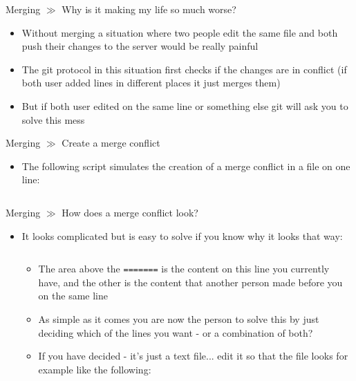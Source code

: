 \documentclass[10pt]{beamer}
\begin{document}
\begin{frame}{Merging $\gg$ Why is it making my life so much worse?}
\begin{itemize}
	\item Without merging a situation where two people edit the same file and both push their changes to the server would be really painful
	\item The git protocol in this situation first checks if the changes are in conflict (if both user added lines in different places it just merges them)
	\item But if both user edited on the same line or something else git will ask you to solve this mess
\end{itemize}
\end{frame}

\begin{frame}{Merging $\gg$ Create a merge conflict}
\begin{itemize}
	\item The following script simulates the creation of a merge conflict in a file on one line:
	\href{https://jonathanmh.com/how-to-create-a-git-merge-conflict/}{} 
	\inputminted[bgcolor=lightGreyCustom,fontsize=\scriptsize]{sh}{./resources/git_merging_03_create_conflict.sh}
\end{itemize}
\end{frame}

\begin{frame}{Merging $\gg$ How does a merge conflict look?}
\begin{itemize}
	\item It looks complicated but is easy to solve if you know why it looks that way:
	\inputminted[bgcolor=lightGreyCustom,fontsize=\scriptsize]{sh}{./resources/git_merging_04_create_conflict_output.sh}
	\begin{itemize}
		\item The area above the \texttt{=======} is the content on this line you currently have, and the other is the content that another person made before you on the same line
		\item As simple as it comes you are now the person to solve this by just deciding which of the lines you want - or a combination of both?
		\item If you have decided - it's just a text file... edit it so that the file looks for example like the following:
		\inputminted[bgcolor=lightGreyCustom,fontsize=\scriptsize]{sh}{./resources/git_merging_05_create_conflict_solved.sh}
	\end{itemize}
\end{itemize}
\end{frame}
\end{document}
